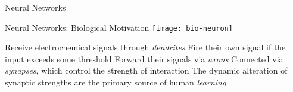 
\begin{frame}
  \centering
  \Huge
  \color{orange}
  \vspace{0.2cm}
  Neural Networks
  \vspace{0.5cm}

\end{frame}

\begin{slide}{Neural Networks: Biological Motivation}
  \centering
  \pause
  \texttt{[image: bio-neuron]}
  \cite{karpathy1}
  \vspace{0.3cm}
  \begin{itemize}
    \pitem Receive electrochemical signals through \emph{dendrites}
    \pitem Fire their own signal if the input exceeds some threshold
    \pitem Forward their signals via \emph{axons}
    \pitem Connected via \emph{synapses}, which control the strength of interaction %
    \pitem The dynamic alteration of synaptic strengths are the primary source of human \emph{learning} %
  \end{itemize}
\end{slide}

